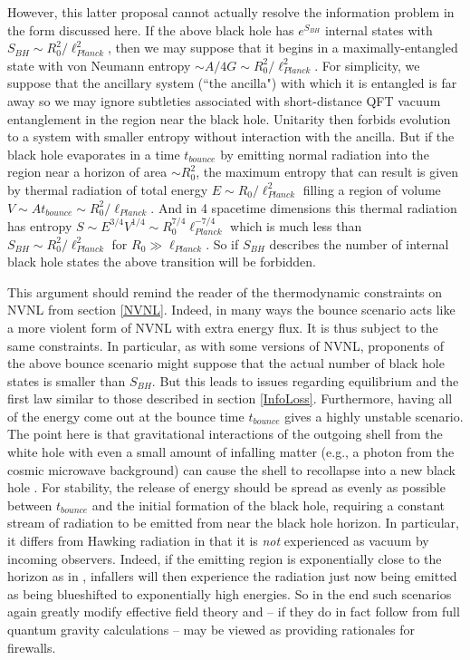 \documentclass[12pt]{article}
\begin{document}
However, this latter proposal cannot actually resolve the information problem in the form discussed here.  If the above black hole has $e^{S_{BH}}$ internal states with $S_{BH} \sim R_0^2/\ell_{Planck}^2$, then we may suppose that it begins in a maximally-entangled state with von Neumann entropy $\sim A/4G \sim R_0^2/\ell_{Planck}^2$.  For simplicity, we suppose that the ancillary system (``the ancilla") with which it is entangled is far away so we may ignore subtleties associated with short-distance QFT vacuum entanglement in the region near the black hole.  Unitarity then forbids evolution to a system with smaller entropy without interaction with the ancilla.  But if the black hole evaporates in a time $t_{bounce}$ by emitting normal radiation into the region near a horizon of area $\sim R_0^2$, the maximum entropy that can result is given by thermal radiation of total energy $E \sim R_0/\ell_{Planck}^2$ filling a region of volume $V \sim A t_{bounce} \sim R_0^2/\ell_{Planck}$.  And in 4 spacetime dimensions this thermal radiation has entropy $S \sim E^{3/4} V^{1/4} \sim R_0^{7/4} \ell_{Planck}^{-7/4}$ which is much less than $S_{BH} \sim R_0^2/\ell_{Planck}^2$ for $R_0 \gg \ell_{Planck}$. So if $S_{BH}$ describes the number of internal black hole states the above transition will be forbidden.

This argument should remind the reader of the thermodynamic constraints on NVNL from section \ref{NVNL}.  Indeed, in many ways the bounce scenario acts like a more violent form of NVNL with extra energy flux.  It is thus subject to the same constraints.  In particular, as with some versions of NVNL, proponents of the above bounce scenario might suppose that the actual number of black hole states is smaller than $S_{BH}$.  But this leads to issues regarding equilibrium and the first law similar to those described in section \ref{InfoLoss}. Furthermore, having all of the energy come out at the bounce time $t_{bounce}$ gives a highly unstable scenario.  The point here is that  gravitational interactions of the outgoing shell from the white hole with even a small amount of infalling matter (e.g., a photon from the cosmic microwave background) can cause the shell to recollapse into a new black hole \cite{PhysRevLett.33.442,Barcelo:2015uff}.  For stability, the release of energy should be spread as evenly as possible between $t_{bounce}$ and the initial formation of the black hole, requiring a constant stream of radiation to be emitted from near the black hole horizon. In particular, it differs from Hawking radiation in that it is {\it not} experienced as vacuum by incoming observers.  Indeed, if the emitting region is exponentially close to the horizon as in \cite{Christodoulou:2016vny},  infallers will then experience the radiation just now being emitted as being blueshifted to exponentially high energies.  So in the end such scenarios again greatly modify effective field theory and -- if they do in fact follow from full quantum gravity calculations -- may be viewed as providing rationales for firewalls.
\end{document}
